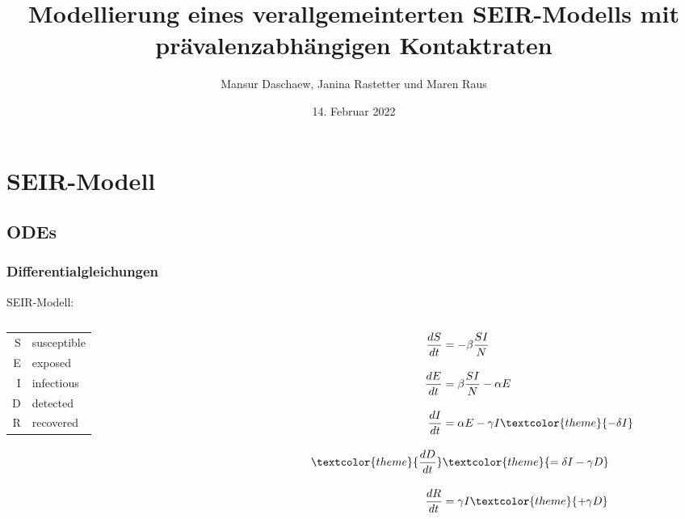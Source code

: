\documentclass{beamer}
\title{Modellierung eines verallgemeinterten SEIR-Modells mit prävalenzabhängigen Kontaktraten}
\date{14. Februar 2022} %
\author{Mansur Daschaew, Janina Rastetter und Maren Raus}
\begin{document}
\maketitle

\tableofcontents

\section{SEIR-Modell}

\subsection{ODEs}
\begin{frame}
	\frametitle{Differentialgleichungen}
SEIR-Modell:
\begin{columns}
\begin{column}{0.2\textwidth}
	\begin{tabular}{rl}
	S & susceptible \\
	E & exposed \\
	I & infectious \\
	\textcolor{theme}{D} & \textcolor{theme}{detected} \\
	R & recovered \\
	\end{tabular}
\end{column}
\begin{column}{0.2\textwidth} 

		\begin{align*}
		\frac{dS}{dt} &= -\beta \frac{SI}{N} \\[10pt]
		\frac{dE}{dt} &= \beta \frac{SI}{N} - \alpha E \\[10pt]
		\frac{dI}{dt} &= \alpha E - \gamma I \textcolor{theme}{ - \delta I} \\[10pt]
		\textcolor{theme}{\frac{dD}{dt}} &\textcolor{theme}{= \delta I - \gamma D} \\[10pt]
		\frac{dR}{dt} &= \gamma I \textcolor{theme}{+ \gamma D }
		\end{align*}
\end{column}
\end{columns}

\end{frame}
\end{document}
